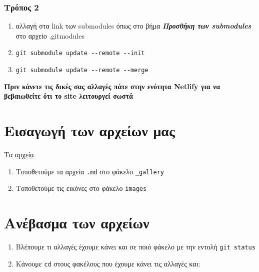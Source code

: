 \hypertarget{ux3c4ux3c1ux3ccux3c0ux3bfux3c2-2}{%
\subsubsection{Τρόπος 2}\label{ux3c4ux3c1ux3ccux3c0ux3bfux3c2-2}}

\begin{enumerate}
\def\labelenumi{\arabic{enumi}.}
\tightlist
\item
  αλλαγή στα link των submodules όπως στο βήμα \textbf{\emph{Προσθήκη
  των submodules}} στο αρχείο .gitmodules
\item
  \texttt{git\ submodule\ update\ -\/-remote\ -\/-init}
\item
  \texttt{git\ submodule\ update\ -\/-remote\ -\/-merge}
\end{enumerate}

\textbf{Πριν κάνετε τις δικές σας αλλαγές πάτε στην ενότητα Netlify για
να βεβαιωθείτε ότι το site λειτουργεί σωστά}

\hypertarget{ux3b5ux3b9ux3c3ux3b1ux3b3ux3c9ux3b3ux3ae-ux3c4ux3c9ux3bd-ux3b1ux3c1ux3c7ux3b5ux3afux3c9ux3bd-ux3bcux3b1ux3c2}{%
\section{Εισαγωγή των αρχείων
μας}\label{ux3b5ux3b9ux3c3ux3b1ux3b3ux3c9ux3b3ux3ae-ux3c4ux3c9ux3bd-ux3b1ux3c1ux3c7ux3b5ux3afux3c9ux3bd-ux3bcux3b1ux3c2}}

Τα \href{https://courses-ionio.github.io/help/social/}{αρχεία}.

\begin{enumerate}
\def\labelenumi{\arabic{enumi}.}
\tightlist
\item
  Τοποθετούμε τα αρχεία \texttt{.md} στο φάκελο \texttt{\_gallery}
\item
  Τοποθετούμε τις εικόνες στο φάκελο \texttt{images}
\end{enumerate}

\hypertarget{ux3b1ux3bdux3adux3b2ux3b1ux3c3ux3bcux3b1-ux3c4ux3c9ux3bd-ux3b1ux3c1ux3c7ux3b5ux3afux3c9ux3bd}{%
\section{Ανέβασμα των
αρχείων}\label{ux3b1ux3bdux3adux3b2ux3b1ux3c3ux3bcux3b1-ux3c4ux3c9ux3bd-ux3b1ux3c1ux3c7ux3b5ux3afux3c9ux3bd}}

\begin{enumerate}
\def\labelenumi{\arabic{enumi}.}
\tightlist
\item
  Βλέπουμε τι αλλαγές έχουμε κάνει και σε ποιό φάκελο με την εντολή
  \texttt{git\ status}
\item
  Κάνουμε \texttt{cd} στους φακέλους που έχουμε κάνει τις αλλαγές και:
\end{enumerate}

